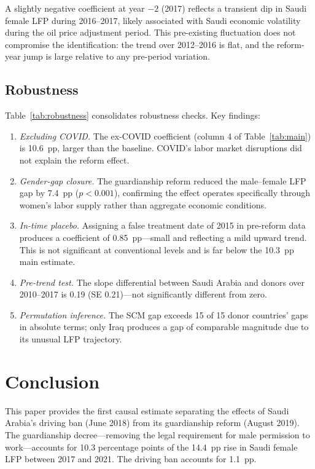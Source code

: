 \documentclass[12pt]{article}
\begin{document}
A slightly negative coefficient at year $-2$ (2017) reflects a transient dip in Saudi female LFP during 2016--2017, likely associated with Saudi economic volatility during the oil price adjustment period. This pre-existing fluctuation does not compromise the identification: the trend over 2012--2016 is flat, and the reform-year jump is large relative to any pre-period variation.

\subsection{Robustness}



Table~\ref{tab:robustness} consolidates robustness checks. Key findings:

\begin{enumerate}
  \item \textit{Excluding COVID.} The ex-COVID coefficient (column 4 of Table~\ref{tab:main}) is 10.6~pp, larger than the baseline. COVID's labor market disruptions did not explain the reform effect.
  \item \textit{Gender-gap closure.} The guardianship reform reduced the male--female LFP gap by 7.4~pp ($p < 0.001$), confirming the effect operates specifically through women's labor supply rather than aggregate economic conditions.
  \item \textit{In-time placebo.} Assigning a false treatment date of 2015 in pre-reform data produces a coefficient of 0.85~pp---small and reflecting a mild upward trend. This is not significant at conventional levels and is far below the 10.3~pp main estimate.
  \item \textit{Pre-trend test.} The slope differential between Saudi Arabia and donors over 2010--2017 is 0.19 (SE 0.21)---not significantly different from zero.
  \item \textit{Permutation inference.} The SCM gap exceeds 15 of 15 donor countries' gaps in absolute terms; only Iraq produces a gap of comparable magnitude due to its unusual LFP trajectory.
\end{enumerate}

\section{Conclusion}

This paper provides the first causal estimate separating the effects of Saudi Arabia's driving ban (June 2018) from its guardianship reform (August 2019). The guardianship decree---removing the legal requirement for male permission to work---accounts for 10.3 percentage points of the 14.4~pp rise in Saudi female LFP between 2017 and 2021. The driving ban accounts for 1.1~pp.
\end{document}
